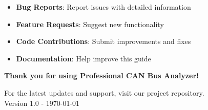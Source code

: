 \documentclass[11pt,a4paper]{article}
\begin{document}
\begin{itemize}
    \item \textbf{Bug Reports}: Report issues with detailed information
    \item \textbf{Feature Requests}: Suggest new functionality
    \item \textbf{Code Contributions}: Submit improvements and fixes
    \item \textbf{Documentation}: Help improve this guide
\end{itemize}

\vspace{2cm}

\begin{center}
\textcolor{canblue}{\Large\textbf{Thank you for using Professional CAN Bus Analyzer!}}

\vspace{0.5cm}

\textcolor{cangray}{
For the latest updates and support, visit our project repository.\\
Version 1.0 - \today
}
\end{center}
\end{document}
